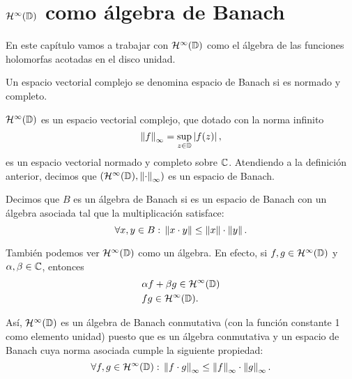 \chapter{$\mathcal{H}^{\infty}(\mathbb{D})$ como álgebra de Banach}

En este capítulo vamos a trabajar con $\mathcal{H}^{\infty}(\mathbb{D})$ como el álgebra de las funciones holomorfas acotadas en el disco unidad. \\

\begin{definition}
    Un espacio vectorial complejo se denomina espacio de Banach si es normado y completo.
\end{definition}

\medskip
$\mathcal{H}^{\infty}(\mathbb{D})$ es un espacio vectorial complejo, que dotado con la norma infinito
\begin{equation*}
    \left\lVert f\right\rVert_{\infty} = \sup_{z \in \mathbb{D}} \left\lvert f(z)\right\rvert,
\end{equation*}
es un espacio vectorial normado y completo sobre $\mathbb{C}$. Atendiendo a la definición anterior, decimos que  $(\mathcal{H}^{\infty}(\mathbb{D}), \left\lVert\cdot\right\rVert_{\infty})$ es un espacio de Banach. \\

\begin{definition}
    Decimos que $B$ es un álgebra de Banach si es un espacio de Banach con un álgebra asociada tal que la multiplicación satisface:
    \begin{equation*}
        \forall x, y \in B: \, \left\lVert x \cdot y\right\rVert \leq \left\lVert x\right\rVert \cdot \left\lVert y\right\rVert.
    \end{equation*}
\end{definition}

\medskip
También podemos ver $\mathcal{H}^{\infty}(\mathbb{D})$ como un álgebra. En efecto, si $f, g \in \mathcal{H}^{\infty}(\mathbb{D})$ y $\alpha, \beta \in \mathbb{C}$, entonces
\begin{equation*}
    \begin{split}
        & \alpha f + \beta g \in \mathcal{H}^{\infty}(\mathbb{D}) \\
        & fg \in \mathcal{H}^{\infty}(\mathbb{D}).
    \end{split}
\end{equation*}

Así, $\mathcal{H}^{\infty}(\mathbb{D})$ es un álgebra de Banach conmutativa (con la función constante 1 como elemento unidad) puesto que es un álgebra conmutativa y un espacio de Banach cuya norma asociada cumple la siguiente propiedad:
\begin{equation*}
    \forall f, g \in \mathcal{H}^{\infty}(\mathbb{D}): \, \left\lVert f \cdot g\right\rVert_{\infty} \leq \left\lVert f\right\rVert_{\infty} \cdot \left\lVert g\right\rVert_{\infty}.
\end{equation*} \\

